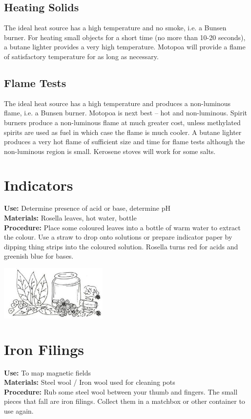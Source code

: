\begin{multicols}{2}
\subsection{Heating Solids} 
The ideal heat source has a high temperature and no smoke, i.e. a Bunsen burner. 
For heating small objects for a short time (no more than 10-20 seconds), 
a butane lighter provides a very high temperature. 
Motopoa will provide a flame of satisfactory temperature 
for as long as necessary.

\subsection{Flame Tests} 
The ideal heat source has a high temperature 
and produces a non-luminous flame, i.e. a Bunsen burner. 
Motopoa is next best – hot and non-luminous. 
Spirit burners produce a non-luminous flame at much greater cost, 
unless methylated spirits are used as fuel 
in which case the flame is much cooler. 
A butane lighter produces a very hot flame of sufficient size 
and time for flame tests although the non-luminous region is small. 
Kerosene stoves will work for some salts.

\columnbreak

\section{Indicators} 
\label{sec:indicator}
\vspace{-10pt}
\textbf{Use:} Determine presence of acid or base, determine pH\\
\textbf{Materials:} Rosella leaves, hot water, bottle\\
\textbf{Procedure:} Place some coloured leaves into a bottle of warm water to extract the colour. Use a straw to drop onto solutions or prepare indicator paper by dipping thing strips into the coloured solution. Rosella turns red for acids and greenish blue for bases.
\begin{center}
\includegraphics[width=0.4\textwidth]{./img/vso/making-indicators.jpg}
\end{center}

\section{Iron Filings} 
\label{sec:iron-filings}
\vspace{-10pt}
\textbf{Use:} To map magnetic fields\\
\textbf{Materials:} Steel wool / Iron wool used for cleaning pots\\
\textbf{Procedure:} Rub some steel wool between your thumb and fingers.  The small pieces that fall are iron filings.  Collect them in a matchbox or other container to use again.


\end{multicols}

